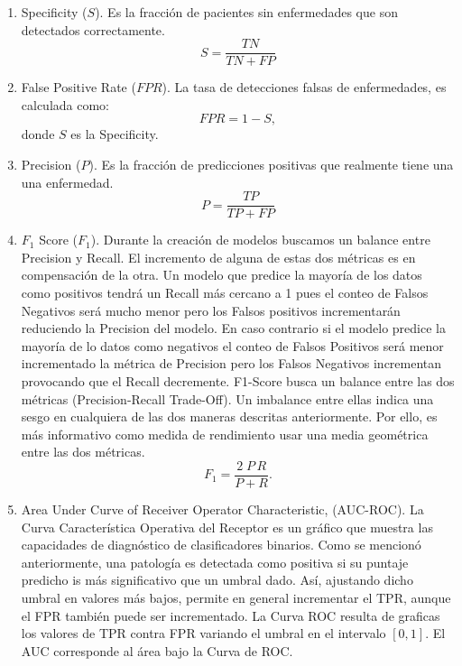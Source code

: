 {\begin{enumerate}
    \item Specificity ($S$). Es la fracción de pacientes sin enfermedades que son detectados
          correctamente.
    \begin{equation}
        \label{eq:Specificity}
        S = \frac{TN}{TN + FP}
    \end{equation}

    \item False Positive Rate ($FPR$). La tasa de detecciones falsas de enfermedades, es calculada
          como:
    \begin{equation}
        \label{eq:FPR}
        FPR = 1 - S,
    \end{equation}
    donde $S$ es la Specificity.

    \item Precision ($P$). Es la fracción de predicciones positivas que realmente tiene una una
          enfermedad.
    \begin{equation}
        \label{eq:P}
        P = \frac{TP}{TP + FP}
    \end{equation}

    \item $F_1$ Score ($F_1$).  Durante la creación de modelos buscamos un balance entre Precision y
          Recall. El incremento
          de alguna de estas dos métricas es en compensación de la otra. Un modelo que predice la
          mayoría de los datos como positivos tendrá un Recall más cercano a 1 pues el conteo de
          Falsos Negativos será mucho menor pero los Falsos positivos incrementarán reduciendo la
          Precision del modelo. En caso contrario si el modelo predice la mayoría de lo datos como
          negativos el conteo de Falsos Positivos será menor incrementado la métrica de Precision
          pero los Falsos Negativos incrementan provocando que el Recall decremente. F1-Score
          busca un balance entre las dos métricas (Precision-Recall Trade-Off). Un imbalance
          entre ellas indica una sesgo en cualquiera de las dos maneras descritas anteriormente.
          Por ello, es más informativo como medida de rendimiento usar una media geométrica entre
          las dos métricas.
    \begin{equation}
        \label{eq:f1}
        F_1 = \frac{2\; P \, R}{P + R}.
    \end{equation}

    \item  Area Under Curve of Receiver Operator Characteristic, (AUC-ROC). La Curva Característica
    Operativa del Receptor es un gráfico que muestra las capacidades de diagnóstico de clasificadores
    binarios. Como se mencionó anteriormente, una patología es detectada como positiva si su puntaje
    predicho is más significativo que un umbral dado. Así, ajustando dicho umbral en valores más
    bajos, permite en general incrementar el TPR, aunque el FPR también puede ser incrementado.
    La Curva ROC resulta de graficas los valores de TPR contra FPR variando el umbral en el intervalo
    $[0,1]$. El AUC corresponde al área bajo la Curva de ROC.


\end{enumerate}}
